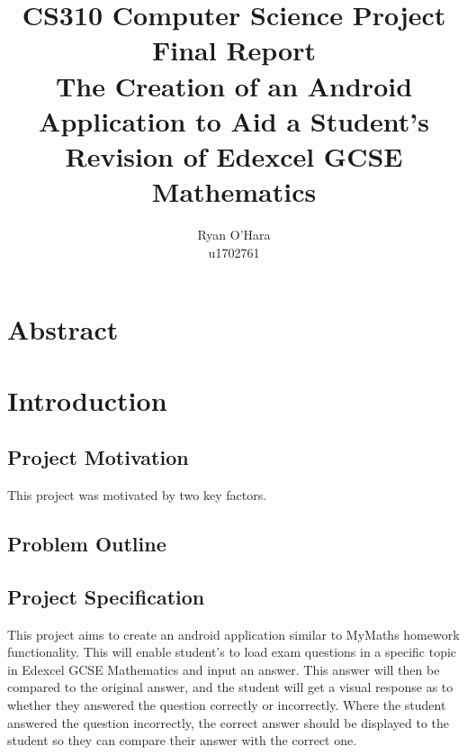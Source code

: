 \documentclass{article}
\title{CS310 Computer Science Project \\ Final Report \\ The Creation of an Android Application to Aid a Student's Revision of Edexcel GCSE Mathematics}
\author{Ryan O'Hara \\ u1702761}
\begin{document}
\maketitle

\newpage

\tableofcontents

\newpage

\section{Abstract}
\label{section:abstract}

\section{Introduction}
\label{section:introduction}

\subsection{Project Motivation}

This project was motivated by two key factors.


\subsection{Problem Outline}



\subsection{Project Specification}

This project aims to create an android application similar to MyMaths homework functionality. This will enable student's to load exam questions in a specific topic in Edexcel GCSE Mathematics and input an answer. This answer will then be compared to the original answer, and the student will get a visual response as to whether they answered the question correctly or incorrectly. Where the student answered the question incorrectly, the correct answer should be displayed to the student so they can compare their answer with the correct one. \\
\end{document}
